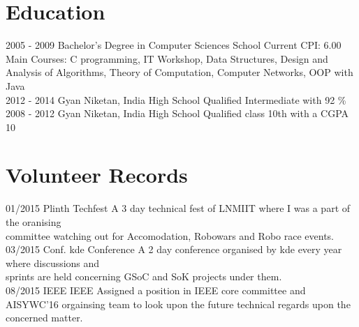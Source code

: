 \documentclass[]{friggeri-cv}
\begin{document}
\section{Education}
\begin{entrylist}
  \entry
    {2005 - 2009}
    {Bachelor's Degree in Computer Sciences}
    {School}
    {Current CPI: 6.00 \\Main Courses: C programming, IT Workshop, Data Structures, Design and Analysis of Algorithms, Theory of Computation, Computer Networks, OOP with Java\\}
  \entry
    {2012 - 2014}
    {Gyan Niketan, India}
    {High School}
    {Qualified Intermediate with 92 \% \\}
  \entry
    {2008 - 2012}
    {Gyan Niketan, India}
    {High School}
    {Qualified class 10th with a CGPA 10}
\end{entrylist}


\section{Volunteer Records}
\begin{entrylist}
  \entry
    {01/2015}
    {Plinth}
    {Techfest}
    {A 3 day technical fest of LNMIIT where I was a part of the oranising \\committee watching out for Accomodation, Robowars and Robo race events.\\}
  \entry
    {03/2015}
    {Conf. kde}
    {Conference}
    {A 2 day conference organised by kde every year where discussions and \\sprints are held concerning GSoC and SoK projects under them.\\}
  \entry
    {08/2015}
    {IEEE}
    {IEEE}
    {Assigned a position in IEEE core committee and AISYWC'16 orgainsing team to look upon the future technical regards upon the concerned matter.}
\end{entrylist}
\end{document}
